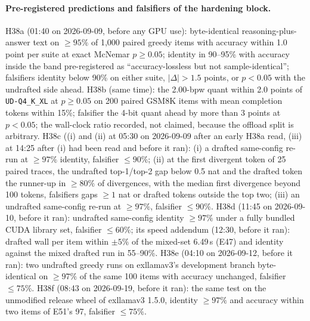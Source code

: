 \documentclass[11pt]{article}
\newcommand{\q}[1]{\texttt{#1}}
\begin{document}
\paragraph{Pre-registered predictions and falsifiers of the hardening block.}
H38a (01:40 on 2026-09-09, before any GPU use): byte-identical
reasoning-plus-answer text on $\ge95\%$ of 1,000 paired greedy items with
accuracy within 1.0 point per suite at exact McNemar $p\ge0.05$; identity in
90--95\% with accuracy inside the band pre-registered as
``accuracy-lossless but not sample-identical''; falsifiers identity below
90\% on either suite, $|\Delta|>1.5$ points, or $p<0.05$ with the undrafted
side ahead. H38b (same time): the 2.00-bpw quant within 2.0 points of
\q{UD-Q4\_K\_XL} at $p\ge0.05$ on 200 paired GSM8K items with mean
completion tokens within 15\%; falsifier the 4-bit quant ahead by more than
3 points at $p<0.05$; the wall-clock ratio recorded, not claimed, because
the offload split is arbitrary. H38c ((i) and (ii) at 05:30 on 2026-09-09
after an early H38a read, (iii) at 14:25 after (i) had been read and before
it ran): (i) a drafted same-config re-run at
$\ge97\%$ identity, falsifier $\le90\%$; (ii) at the first divergent token
of 25 paired traces, the undrafted top-1/top-2 gap below 0.5 nat and the
drafted token the runner-up in $\ge80\%$ of divergences, with the median
first divergence beyond 100 tokens, falsifiers gaps $\ge1$ nat or drafted
tokens outside the top two; (iii) an undrafted same-config re-run at
$\ge97\%$, falsifier $\le90\%$. H38d (11:45 on 2026-09-10, before it ran):
undrafted same-config identity $\ge97\%$ under a fully bundled CUDA library
set, falsifier $\le60\%$; its speed addendum (12:30, before it ran): drafted
wall per item within $\pm5\%$ of the mixed-set 6.49\,s (E47) and identity
against the mixed drafted run in 55--90\%. H38e (04:10 on 2026-09-12, before
it ran): two undrafted greedy runs on exllamav3's development branch
byte-identical on $\ge97\%$ of the same 100 items with accuracy unchanged,
falsifier $\le75\%$. H38f (08:43 on 2026-09-19, before it ran): the same test
on the unmodified release wheel of exllamav3 1.5.0, identity $\ge97\%$ and
accuracy within two items of E51's 97, falsifier $\le75\%$.
\end{document}
